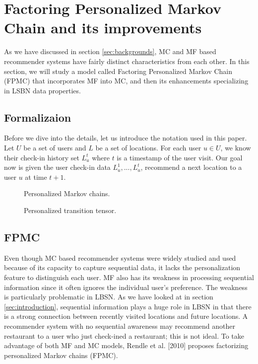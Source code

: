 \documentclass{sig-alternate}
\begin{document}
\section{Factoring Personalized Markov Chain and its improvements}
\label{sec:fpmc}

As we have discussed in section \ref{sec:backgrounds}, MC and MF based recommender systems
have fairly distinct characteristics from each other. In this section, we will study a model called 
Factoring Personalized Markov Chain (FPMC) that incorporates MF into MC, and then its 
enhancements specializing in LSBN data properties.

\subsection{Formalizaion}
\label{sec:typeChangesSpecialChars}

Before we dive into the details, let us introduce the notation used in this paper. 
Let $U$ be a set of users and $L$ be a set of locations. For each user $u \in U$, 
we know their check-in history set \begin{math}L^t_u\end{math} where $t$ is a timestamp 
of the user visit. Our goal now is given the user check-in data 
\begin{math}L^1_u,...,L^t_u\end{math}, recommend a next location to 
a user $u$ at time $t + 1$.

\begin{figure*}
\centering
{}
\caption{Personalized Markov chains.}
\label{fig:FPMC_naive}
\end{figure*}

\begin{figure}
\centering
{}
\caption{Personalized transition tensor.}
\label{fig:FPMC}
\end{figure}

\subsection{FPMC}
\label{sec:typeChangesSpecialChars}

Even though MC based recommender systems were widely studied and used because of 
its capacity to capture sequential data, it lacks the personalization feature to distinguish each user. 
MF also has its weakness in processing sequential information since it often ignores
 the individual user's preference. The weakness is particularly problematic in LBSN. 
As we have looked at in section \ref{sec:introduction}, sequential information plays a huge role in LBSN 
in that there is a strong connection between recently visited locations and future locations. 
A recommender system with no sequential awareness 
may recommend another restaurant to a user who just check-ined a restaurant; this is not ideal. 
To take advantage of both MF and MC models, Rendle et al. [2010] proposes factorizing personalized 
Markov chains (FPMC).
\end{document}
